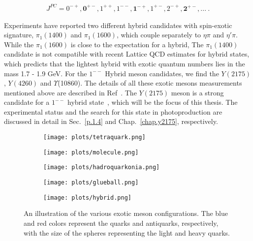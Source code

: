\begin{equation}
    \label{eq.1.2.2}
    \begin{aligned}
        J^{PC} = 0^{-+}, \bm{0^{+-}}, 1^{++}, 1^{--}, \bm{1^{-+}}, 1^{+-}, 2^{-+}, \bm{2^{+-}},...~.
    \end{aligned}
\end{equation}

Experiments have reported two different hybrid candidates with spin-exotic signature, $\pi_{1}(1400)$ and $\pi_{1}(1600)$, which couple separately to $\eta\pi$ and $\eta \prime \pi$. While the $\pi_{1}(1600)$ is close to the expectation for a hybrid, The $\pi_{1}(1400)$ candidate is not compatible with recent Lattice QCD estimates for hybrid states, which predicts that the lightest hybrid with exotic quantum numbers lies in the mass 1.7 - 1.9 GeV. For the $1^{--}$ Hybrid meson candidates, we find the $Y(2175)$, $Y(4260)$ and $\Upsilon$(10860). The details of all these exotic mesons measurements mentioned above are described in Ref~\cite{Tanabashi18}. The $Y(2175)$ meson is a strong candidate for a $1^{--}$ hybrid state~\cite{Gui07}, which will be the focus of this thesis. The experimental status and the search for this state in photoproduction are discussed in detail in Sec.~\ref{p.1.4} and Chap.~\ref{chap.y2175}, respectively.

\begin{center}
    \null
    \vfill
\begin{figure}[h]
    \centering
    \begin{subfigure}[b]{0.2\textwidth}
        \texttt{[image: plots/tetraquark.png]}
        \caption{}
        \label{fig.1.2.2.a}
    \end{subfigure}\hfill
    \begin{subfigure}[b]{0.2\textwidth}
        \texttt{[image: plots/molecule.png]}
        \caption{}
        \label{fig.1.2.2.b}
    \end{subfigure}\hfill
    \begin{subfigure}[b]{0.2\textwidth}
        \texttt{[image: plots/hadroquarkonia.png]}
        \caption{}
        \label{fig.1.2.2.c}
    \end{subfigure}\hfill
    \begin{subfigure}[b]{0.2\textwidth}
        \texttt{[image: plots/glueball.png]}
        \caption{}
        \label{fig.1.2.2.d}
    \end{subfigure}\hfill
    \begin{subfigure}[b]{0.2\textwidth}
        \texttt{[image: plots/hybrid.png]}
        \caption{}
        \label{fig.1.2.2.e}
    \end{subfigure}    
    \caption{An illustration of the various exotic meson configurations. The blue and red colors represent the quarks and antiquarks, respectively, with the size of the spheres representing the light and heavy quarks.}
    \label{fig.1.2.2}
\end{figure}
\null
\vfill
\end{center}

